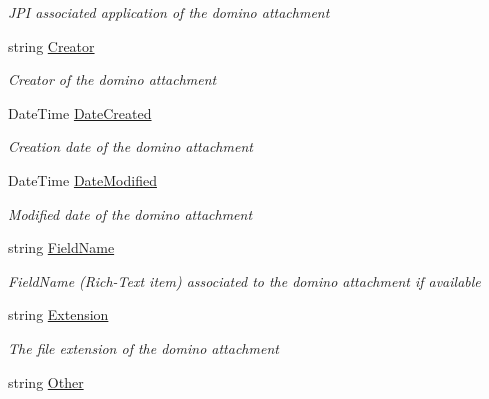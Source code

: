 \begin{DoxyCompactItemize}
\begin{DoxyCompactList}\small\item\em J\+PI associated application of the domino attachment \end{DoxyCompactList}\item 
string \mbox{\hyperlink{class_file_object_a1ab7d29c80841b60b276b7430f4e5ec7}{Creator}}
\begin{DoxyCompactList}\small\item\em Creator of the domino attachment \end{DoxyCompactList}\item 
Date\+Time \mbox{\hyperlink{class_file_object_a372b9a7dad068368526b0698550f9504}{Date\+Created}}
\begin{DoxyCompactList}\small\item\em Creation date of the domino attachment \end{DoxyCompactList}\item 
Date\+Time \mbox{\hyperlink{class_file_object_a9a4c52e205bee3f8bdfa7040f465b6af}{Date\+Modified}}
\begin{DoxyCompactList}\small\item\em Modified date of the domino attachment \end{DoxyCompactList}\item 
string \mbox{\hyperlink{class_file_object_a26fa0ac628fee2387b7f89c78f93842e}{Field\+Name}}
\begin{DoxyCompactList}\small\item\em Field\+Name (Rich-\/\+Text item) associated to the domino attachment if available \end{DoxyCompactList}\item 
string \mbox{\hyperlink{class_file_object_ae25b58dc19def323da91a48e17ba13ed}{Extension}}
\begin{DoxyCompactList}\small\item\em The file extension of the domino attachment \end{DoxyCompactList}\item 
string \mbox{\hyperlink{class_file_object_ab91b5eca56a04784f8d0187247e1280c}{Other}}

\end{DoxyCompactItemize}
